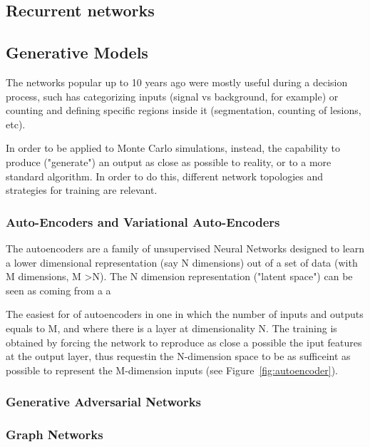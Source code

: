 \subsection{Recurrent networks}

\subsection{Generative Models}
The networks popular up to 10 years ago were mostly useful during a decision process, such has categorizing inputs (signal vs background, for example) or counting and defining specific regions inside it (segmentation, counting of lesions, etc).

In order to be applied to Monte Carlo simulations, instead, the capability to produce ("generate") an output as close as possible to reality, or to a more standard algorithm. In order to do this, different network topologies and strategies for training are relevant.


\subsubsection{Auto-Encoders and Variational Auto-Encoders}
\label{sec:unsupervised}
The autoencoders are a family of unsupervised Neural Networks designed to learn a lower dimensional representation (say N dimensions) out of a set of data (with M dimensions, M \textgreater N). The N dimension representation ("latent space") can be seen as coming from a a 

The easiest for of autoencoders in one in which the number of inputs and outputs equals to M, and where there is a layer at dimensionality N. The training is obtained by forcing the network to reproduce as close a possible the iput features at the output layer, thus requestin the N-dimension space to be as sufficeint as possible to represent the M-dimension inputs (see Figure~\ref{fig:autoencoder}).


\subsubsection{Generative Adversarial Networks}
\subsubsection{Graph Networks}




